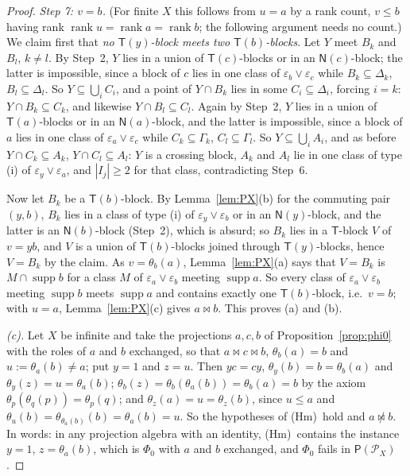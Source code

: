 \documentclass[11pt]{amsart}
\theoremstyle{definition}
\renewcommand{\P}{\mathcal{P}}      %
\newcommand{\PA}{\mathsf{P}}         %
\newcommand{\supp}{\operatorname{supp}}
\newcommand{\T}{\mathsf{T}}
\newcommand{\N}{\mathsf{N}}
\newcommand{\rk}{\operatorname{rank}}
\newcommand{\mt}{\bowtie}      %
\newcommand{\Kzero}{\textup{(Hm)}}     %
\begin{document}
\begin{proof}
\smallskip\emph{Step 7: $v=b$.} (For finite $X$ this follows from $u=a$ by a rank count, $v\le b$ having rank $\rk u=\rk a=\rk b$; the following argument needs no count.) We claim first that \emph{no $\T(y)$-block meets two $\T(b)$-blocks}. Let $Y$ meet $B_k$ and $B_l$, $k\ne l$. By Step~2, $Y$ lies in a union of $\T(c)$-blocks or in an $\N(c)$-block; the latter is impossible, since a block of $c$ lies in one class of $\varepsilon_b\vee\varepsilon_c$ while $B_k\subseteq\Delta_k$, $B_l\subseteq\Delta_l$. So $Y\subseteq\bigcup_iC_i$, and a point of $Y\cap B_k$ lies in some $C_i\subseteq\Delta_i$, forcing $i=k$: $Y\cap B_k\subseteq C_k$, and likewise $Y\cap B_l\subseteq C_l$. Again by Step~2, $Y$ lies in a union of $\T(a)$-blocks or in an $\N(a)$-block, and the latter is impossible, since a block of $a$ lies in one class of $\varepsilon_a\vee\varepsilon_c$ while $C_k\subseteq\Gamma_k$, $C_l\subseteq\Gamma_l$. So $Y\subseteq\bigcup_iA_i$, and as before $Y\cap C_k\subseteq A_k$, $Y\cap C_l\subseteq A_l$: $Y$ is a crossing block, $A_k$ and $A_l$ lie in one class of type (i) of $\varepsilon_y\vee\varepsilon_a$, and $|I_j|\ge2$ for that class, contradicting Step~6.

Now let $B_k$ be a $\T(b)$-block. By Lemma~\ref{lem:PX}(b) for the commuting pair $(y,b)$, $B_k$ lies in a class of type (i) of $\varepsilon_y\vee\varepsilon_b$ or in an $\N(y)$-block, and the latter is an $\N(b)$-block (Step~2), which is absurd; so $B_k$ lies in a $\T$-block $V$ of $v=yb$, and $V$ is a union of $\T(b)$-blocks joined through $\T(y)$-blocks, hence $V=B_k$ by the claim. As $v=\theta_b(a)$, Lemma~\ref{lem:PX}(a) says that $V=B_k$ is $M\cap\supp b$ for a class $M$ of $\varepsilon_a\vee\varepsilon_b$ meeting $\supp a$. So every class of $\varepsilon_a\vee\varepsilon_b$ meeting $\supp b$ meets $\supp a$ and contains exactly one $\T(b)$-block, i.e.\ $v=b$; with $u=a$, Lemma~\ref{lem:PX}(c) gives $a\mt b$. This proves (a) and (b).

\smallskip\emph{(c).} Let $X$ be infinite and take the projections $a,c,b$ of Proposition~\ref{prop:phi0} with the roles of $a$ and $b$ exchanged, so that $a\mt c\mt b$, $\theta_b(a)=b$ and $u:=\theta_a(b)\ne a$; put $y=1$ and $z=u$. Then $yc=cy$, $\theta_y(b)=b=\theta_b(a)$ and $\theta_y(z)=u=\theta_a(b)$; $\theta_b(z)=\theta_b(\theta_a(b))=\theta_b(a)=b$ by the axiom $\theta_p(\theta_q(p))=\theta_p(q)$; and $\theta_z(a)=u=\theta_z(b)$, since $u\le a$ and $\theta_u(b)=\theta_{\theta_a(b)}(b)=\theta_a(b)=u$. So the hypotheses of \Kzero\ hold and $a\not\mt b$. In words: in any projection algebra with an identity, \Kzero\ contains the instance $y=1$, $z=\theta_a(b)$, which is $\Phi_0$ with $a$ and $b$ exchanged, and $\Phi_0$ fails in $\PA(\P_X)$.
\end{proof}
\end{document}
